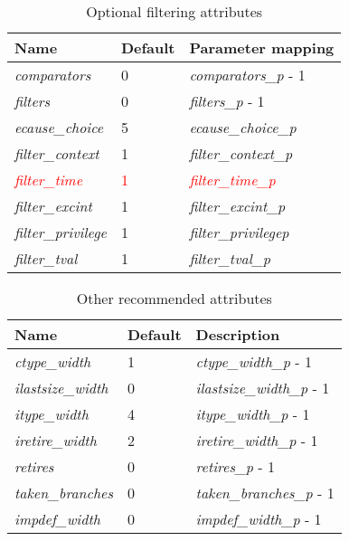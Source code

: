 \begin{table}[!h]
    \centering
    \caption{Optional filtering attributes}
    \label{tab:optionalAttributes}
    \begin{tabulary}{\textwidth}{|l|l|p{80mm}|}
        \hline
        \textbf{Name} & \textbf{Default} & \textbf{Parameter mapping} \\
        \hline
         \textit{comparators} & 0 & \textit{comparators\_p} - 1\\
        \hline
        \textit{filters} & 0 & \textit{filters\_p} - 1\\
        \hline
        \textit{ecause\_choice} & 5 & \textit{ecause\_choice\_p}\\
        \hline
        \textit{filter\_context} & 1 & \textit{filter\_context\_p}\\
        \hline
        \textcolor{red}{\textit{filter\_time}} & \textcolor{red}{1} & \textcolor{red}{\textit{filter\_time\_p}}\\
        \hline
        \textit{filter\_excint} & 1 & \textit{filter\_excint\_p}\\
        \hline
        \textit{filter\_privilege} & 1 & \textit{filter\_privilege\-p}\\
        \hline
        \textit{filter\_tval} & 1 & \textit{filter\_tval\_p}\\
        \hline
    \end{tabulary}
\end{table}

\begin{table}[!h]
    \centering
    \caption{Other recommended attributes}
    \label{tab:otherAttributes}
    \begin{tabulary}{\textwidth}{|l|l|p{80mm}|}
        \hline
        \textbf{Name} & \textbf{Default} & \textbf{Description} \\
        \hline
        \textit{ctype\_width} & 1 & \textit{ctype\_width\_p} - 1\\
        \hline
        \textit{ilastsize\_width} & 0 & \textit{ilastsize\_width\_p} - 1\\
        \hline
        \textit{itype\_width} & 4 & \textit{itype\_width\_p} - 1\\
        \hline
        \textit{iretire\_width} & 2 & \textit{iretire\_width\_p} - 1\\
        \hline
        \textit{retires} & 0 & \textit{retires\_p} - 1\\
        \hline
        \textit{taken\_branches} & 0 & \textit{taken\_branches\_p} - 1\\
        \hline
        \textit{impdef\_width} & 0 & \textit{impdef\_width\_p} - 1\\
        \hline
    \end{tabulary}
\end{table}

